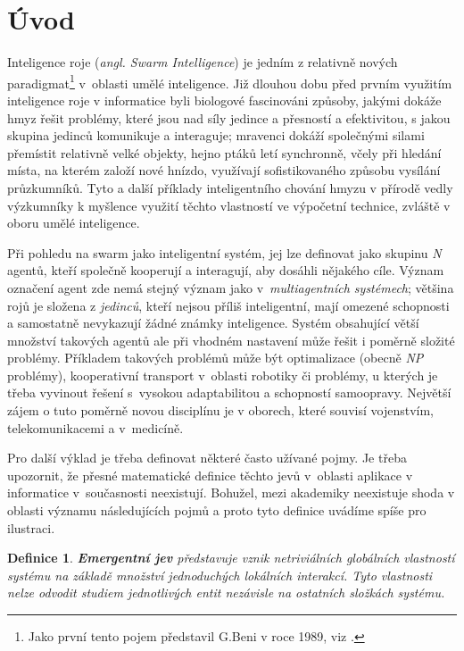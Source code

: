 \documentclass[a4paper,12pt]{article}
\newtheorem{define}{Definice}
\begin{document}


\tableofcontents
\newpage


\section{Úvod}
Inteligence roje ({\it angl. Swarm Intelligence}) je jedním z relativně nových
paradigmat\footnote{Jako první tento pojem představil G.Beni v roce 1989, viz
\cite{BeniWang89}.} v~oblasti umělé inteligence. Již dlouhou dobu před prvním
využitím inteligence roje v informatice byli biologové fascinováni způsoby,
jakými dokáže hmyz řešit problémy, které jsou nad síly jedince a přesností
a efektivitou, s jakou skupina jedinců komunikuje a interaguje; mravenci dokáží
společnými silami přemístit relativně velké objekty, hejno ptáků letí synchronně, 
včely při hledání místa, na kterém založí nové hnízdo, využívají sofistikovaného
způsobu vysílání průzkumníků. Tyto a další příklady inteligentního chování hmyzu
v přírodě vedly výzkumníky k myšlence využití těchto vlastností ve výpočetní
technice, zvláště v oboru umělé inteligence.

Při pohledu na swarm jako inteligentní systém, jej lze definovat jako skupinu
{\it N} agentů, kteří společně kooperují a interagují, aby dosáhli nějakého cíle.
Význam označení agent zde nemá stejný význam jako v~{\it multiagentních systémech};
většina rojů je složena z {\it jedinců}, kteří nejsou příliš inteligentní, mají omezené
schopnosti a samostatně nevykazují žádné známky inteligence. Systém obsahující větší
množství takových agentů ale při vhodném nastavení může řešit i poměrně složité
problémy. Příkladem takových problémů může být optimalizace (obecně {\it NP} problémy),
kooperativní transport v~oblasti robotiky či problémy, u kterých je třeba vyvinout
řešení s~vysokou adaptabilitou a schopností samoopravy. Největší zájem o tuto poměrně
novou disciplínu je v oborech, které souvisí vojenstvím, telekomunikacemi a v~medicíně.

Pro další výklad je třeba definovat některé často užívané pojmy. Je třeba upozornit,
že přesné matematické definice těchto jevů v~oblasti aplikace v informatice v~současnosti
neexistují. Bohužel, mezi akademiky neexistuje shoda v oblasti významu následujících pojmů
a proto tyto definice uvádíme spíše pro ilustraci.
\begin{define}
  {\bf Emergentní jev} představuje vznik netriviálních globálních vlastností systému na
  základě množství jednoduchých lokálních interakcí. Tyto vlastnosti nelze odvodit studiem
  jednotlivých entit nezávisle na ostatních složkách systému.
\end{define}
\end{document}
